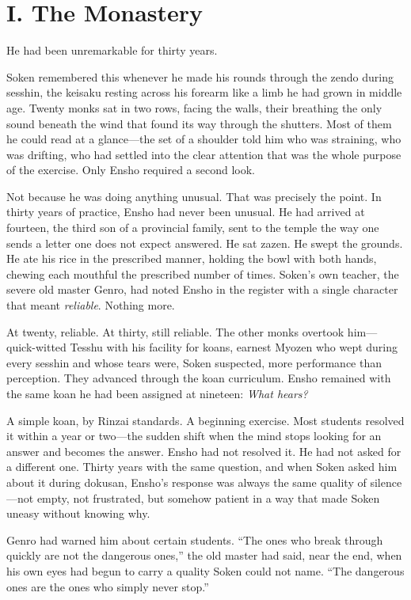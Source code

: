 \section*{I. The Monastery}

He had been unremarkable for thirty years.

Soken remembered this whenever he made his rounds through the zendo during sesshin, the keisaku resting across his forearm like a limb he had grown in middle age. Twenty monks sat in two rows, facing the walls, their breathing the only sound beneath the wind that found its way through the shutters. Most of them he could read at a glance---the set of a shoulder told him who was straining, who was drifting, who had settled into the clear attention that was the whole purpose of the exercise. Only Ensho required a second look.

Not because he was doing anything unusual. That was precisely the point. In thirty years of practice, Ensho had never been unusual. He had arrived at fourteen, the third son of a provincial family, sent to the temple the way one sends a letter one does not expect answered. He sat zazen. He swept the grounds. He ate his rice in the prescribed manner, holding the bowl with both hands, chewing each mouthful the prescribed number of times. Soken's own teacher, the severe old master Genro, had noted Ensho in the register with a single character that meant \emph{reliable}. Nothing more.

At twenty, reliable. At thirty, still reliable. The other monks overtook him---quick-witted Tesshu with his facility for koans, earnest Myozen who wept during every sesshin and whose tears were, Soken suspected, more performance than perception. They advanced through the koan curriculum. Ensho remained with the same koan he had been assigned at nineteen: \emph{What hears?}

A simple koan, by Rinzai standards. A beginning exercise. Most students resolved it within a year or two---the sudden shift when the mind stops looking for an answer and becomes the answer. Ensho had not resolved it. He had not asked for a different one. Thirty years with the same question, and when Soken asked him about it during dokusan, Ensho's response was always the same quality of silence---not empty, not frustrated, but somehow patient in a way that made Soken uneasy without knowing why.

Genro had warned him about certain students. ``The ones who break through quickly are not the dangerous ones,'' the old master had said, near the end, when his own eyes had begun to carry a quality Soken could not name. ``The dangerous ones are the ones who simply never stop.''

